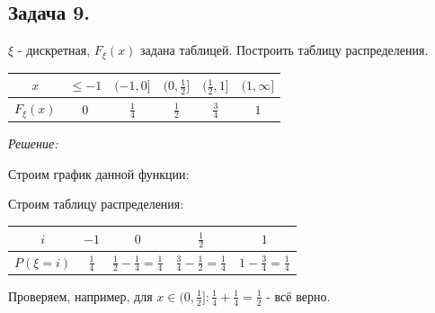 \subsection*{Задача 9.}

$\xi$ - дискретная,  $F_{\xi}(x)$ задана таблицей. Построить таблицу распределения.
\begin{table}[H]
	\centering\makegapedcells
	\begin{tabular}{|c|c|c|c|c|c|}
		\hline
		$x$          & $\le -1$ & $(-1,0]$      & $(0,\frac{1}{2}]$ & $(\frac{1}{2},1]$ & $(1,\infty]$ \\ \hline
		$F_{\xi}(x)$ & $0$      & $\frac{1}{4}$ & $\frac{1}{2}$     & $\frac{3}{4}$     & $1$          \\ \hline
	\end{tabular}
\end{table}

\noindent \textit{Решение:}

Строим график данной функции:
\begin{figure}[H]
\end{figure}
Строим таблицу распределения:
\begin{table}[H]
	\centering\makegapedcells
	\begin{tabular}{|c|c|c|c|c|}
		\hline
		$i$          & $-1$         & $0$                                       & $\frac{1}{2}$                             & $1$                             \\ \hline
		$P(\xi = i)$ & $\frac{1}{4}$ & $\frac{1}{2} - \frac{1}{4} = \frac{1}{4}$ & $\frac{3}{4} - \frac{1}{2} = \frac{1}{4}$ & $1 - \frac{3}{4} = \frac{1}{4}$ \\ \hline
	\end{tabular}
\end{table}
Проверяем, например, для $x \in (0,\frac{1}{2}]: \frac{1}{4} + \frac{1}{4} = \frac{1}{2}$ - всё верно.

